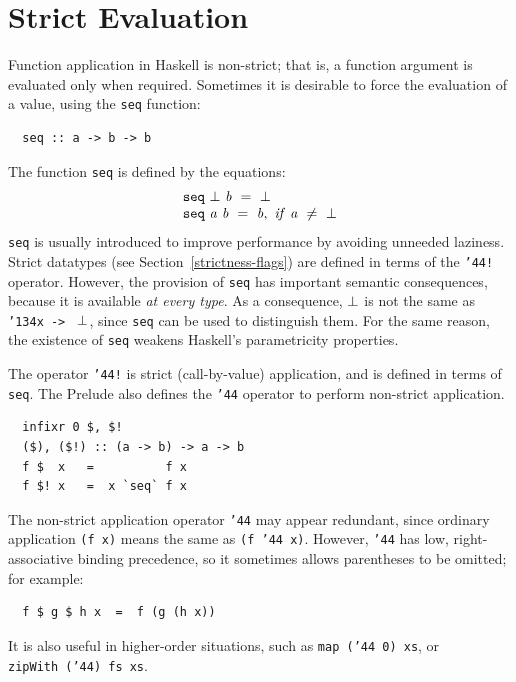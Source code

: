 \section{Strict Evaluation}
\label{strict-eval}
Function application in Haskell is non-strict; that is, a function
argument is evaluated only when required.  Sometimes it is desirable to
force the evaluation of a value, using the \mbox{\tt seq} function:
\bprog
{\small\begin{verbatim}
  seq :: a -> b -> b
\end{verbatim}}
\eprog
The function \mbox{\tt seq} is defined by the equations:
\[\ba{l}
\mbox{$\it \makebox{\tt seq}\ \bot\ b\ =\ \bot$} \\
\mbox{$\it \makebox{\tt seq}\ a\ b\ =\ b,\ if\ a\ \ne\ \bot$} \\
\ea\]\ifhtml{\\}{}
\mbox{\tt seq} is usually introduced to improve performance by
avoiding unneeded laziness.  Strict datatypes (see
Section~\ref{strictness-flags}) are defined in terms of the \mbox{\tt {\char'44}!}
operator. 
However, the provision of \mbox{\tt seq} has important semantic consequences, because it is available
{\em at every type}.
As a consequence, \mbox{$\it \bot$} is
not the same as \mbox{\tt {\char'134}x\ ->\ } \mbox{$\it \bot$}, since \mbox{\tt seq} can be used to distinguish them.
For the same reason, the existence of \mbox{\tt seq} weakens Haskell's parametricity properties.

The operator \mbox{\tt {\char'44}!} is strict (call-by-value) application, and is defined
in terms of \mbox{\tt seq}.  The Prelude also defines the \mbox{\tt {\char'44}} operator to perform 
non-strict application.
\bprog
{\small\begin{verbatim}
  infixr 0 $, $!
  ($), ($!) :: (a -> b) -> a -> b
  f $  x   =          f x
  f $! x   =  x `seq` f x
\end{verbatim}}
\eprog
The non-strict application operator \mbox{\tt {\char'44}} may appear redundant, since 
ordinary application \mbox{\tt (f\ x)} means the same as \mbox{\tt (f\ {\char'44}\ x)}.
However, \mbox{\tt {\char'44}} has low, right-associative binding precedence,
so it sometimes allows parentheses to be omitted; for example:
\bprog
{\small\begin{verbatim}
  f $ g $ h x  =  f (g (h x))
\end{verbatim}}
\eprog
It is also useful in higher-order situations, such as \mbox{\tt map\ ({\char'44}\ 0)\ xs},
or \mbox{\tt zipWith\ ({\char'44})\ fs\ xs}.

